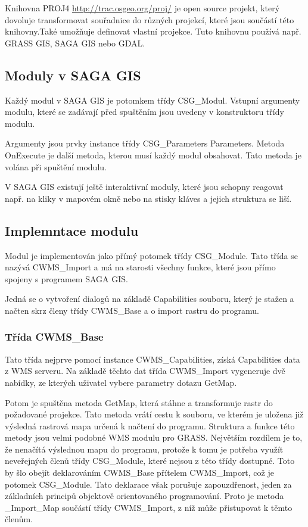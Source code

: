 \documentclass[a4paper,12pt]{article}
\begin{document}
Knihovna PROJ4 \url{http://trac.osgeo.org/proj/} je open source projekt, který dovoluje transformovat souřadnice do různých projekcí, které jsou součástí této knihovny.Také umožňuje definovat vlastní 
projekce. Tuto knihovnu používá např. GRASS GIS, SAGA GIS nebo GDAL.

\subsection{Moduly v SAGA GIS}

Každý modul v SAGA GIS je potomkem třídy CSG\_Modul. Vstupní argumenty modulu, které se zadávají před spuštěním jsou uvedeny v konstruktoru třídy modulu.

Argumenty jsou prvky instance třídy CSG\_Parameters Parameters. 
Metoda OnExecute je další metoda, kterou musí každý modul obsahovat. Tato metoda je volána při spuštění modulu. 

V SAGA GIS existují ještě interaktivní moduly, které jsou schopny reagovat např. na kliky v mapovém okně nebo na stisky kláves a jejich struktura se liší.    


\subsection{Implemntace modulu}
Modul je implementován jako přímý potomek třídy CSG\_Module. Tato třída se nazývá CWMS\_Import a má na starosti všechny funkce, které jsou přímo spojeny s programem SAGA GIS.

Jedná se o vytvoření dialogů na základě Capabilities souboru, který je stažen a načten  skrz členy třídy CWMS\_Base a o import rastru do programu. 

\subsubsection{Třída CWMS\_Base}

Tato třída nejprve pomocí instance CWMS\_Capabilities, získá Capabilities data z WMS serveru. Na základě těchto dat třída CWMS\_Import vygeneruje dvě nabídky, ze kterých uživatel vybere parametry dotazu GetMap. 

Potom je spuštěna metoda GetMap, která stáhne a transformuje rastr do požadované projekce. Tato metoda vrátí cestu k souboru, ve kterém je uložena již výsledná rastrová mapa určená k načtení do programu.
Struktura a funkce této metody jsou velmi podobné WMS modulu pro GRASS. Největším rozdílem je to, že nenačítá výslednou mapu do programu, protože k tomu je potřeba využít neveřejných členů třídy CSG\_Module, 
které nejsou z této třídy dostupné. Toto by šlo obejít deklarováním CWMS\_Base přítelem CWMS\_Import, což je potomek CSG\_Module. Tato deklarace však porušuje zapouzdřenost, jeden za základních principů objektově orientovaného
programování. Proto je metoda \_Import\_Map součástí třídy CWMS\_Import, z níž může přistupovat k těmto členům.
\end{document}
